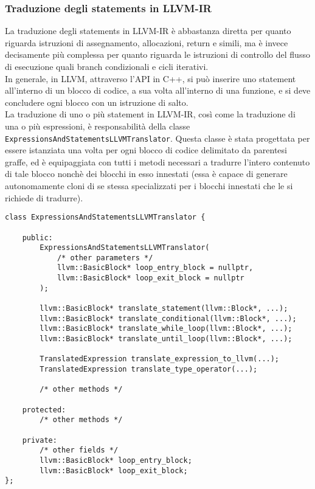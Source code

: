 \subsubsection{Traduzione degli statements in LLVM-IR}
La traduzione degli statements in LLVM-IR è abbastanza diretta per quanto riguarda istruzioni di assegnamento,
allocazioni, return e simili, ma è invece decisamente più complessa per quanto riguarda le istruzioni di controllo
del flusso di esecuzione quali branch condizionali e cicli iterativi. \\

In generale, in LLVM, attraverso l'API in C++, si può inserire uno statement all'interno di un blocco di codice, 
a sua volta all'interno di una funzione, e si deve concludere ogni blocco con un istruzione di salto. \\

La traduzione di uno o più statement in LLVM-IR, così come la traduzione di una o più espressioni, è responsabilità
della classe \texttt{ExpressionsAndStatementsLLVMTranslator}. Questa classe è stata progettata per essere istanziata 
una volta per ogni blocco di codice delimitato da parentesi graffe, ed è equipaggiata con tutti i metodi necessari a 
tradurre l'intero contenuto di tale blocco nonchè dei blocchi in esso innestati (essa è capace di generare autonomamente
cloni di se stessa specializzati per i blocchi innestati che le si richiede di tradurre). \\

\vspace{0.5cm}
\begin{lstlisting}[frame=single]
class ExpressionsAndStatementsLLVMTranslator {
    
    public:
        ExpressionsAndStatementsLLVMTranslator(
            /* other parameters */
            llvm::BasicBlock* loop_entry_block = nullptr,
            llvm::BasicBlock* loop_exit_block = nullptr
        );

        llvm::BasicBlock* translate_statement(llvm::Block*, ...);
        llvm::BasicBlock* translate_conditional(llvm::Block*, ...);
        llvm::BasicBlock* translate_while_loop(llvm::Block*, ...);
        llvm::BasicBlock* translate_until_loop(llvm::Block*, ...);
        
        TranslatedExpression translate_expression_to_llvm(...);
        TranslatedExpression translate_type_operator(...);

        /* other methods */

    protected:        
        /* other methods */

    private:
        /* other fields */
        llvm::BasicBlock* loop_entry_block;
        llvm::BasicBlock* loop_exit_block;
};
\end{lstlisting}
\vspace{0.5cm}

